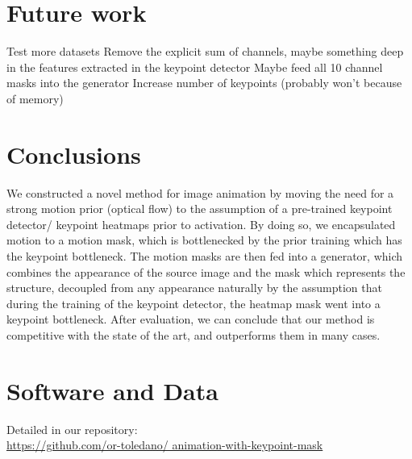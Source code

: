 \documentclass{article}
\begin{document}
\section{Future work}
Test more datasets
Remove the explicit sum of channels, maybe something deep in the features
extracted in the keypoint detector
Maybe feed all 10 channel masks into the generator
Increase number of keypoints (probably won't because of memory)

\section{Conclusions}
We constructed a novel method for image animation by moving the need for
a strong motion prior (optical flow) to the assumption of a pre-trained
keypoint detector/ keypoint heatmaps prior to activation.
By doing so, we encapsulated motion to a motion mask, which is
bottlenecked by the prior training which has the keypoint bottleneck.
The motion masks are then fed into a generator, which combines the
appearance of the source image and the mask which represents the structure,
decoupled from any appearance naturally by the assumption that during the
training of the keypoint detector, the heatmap mask went into a keypoint
bottleneck. After evaluation, we can conclude that our method is
competitive with the state of the art, and outperforms them in many cases.
\section*{Software and Data}
Detailed in our repository:
\\
\url{https://github.com/or-toledano/
animation-with-keypoint-mask}


\end{document}

